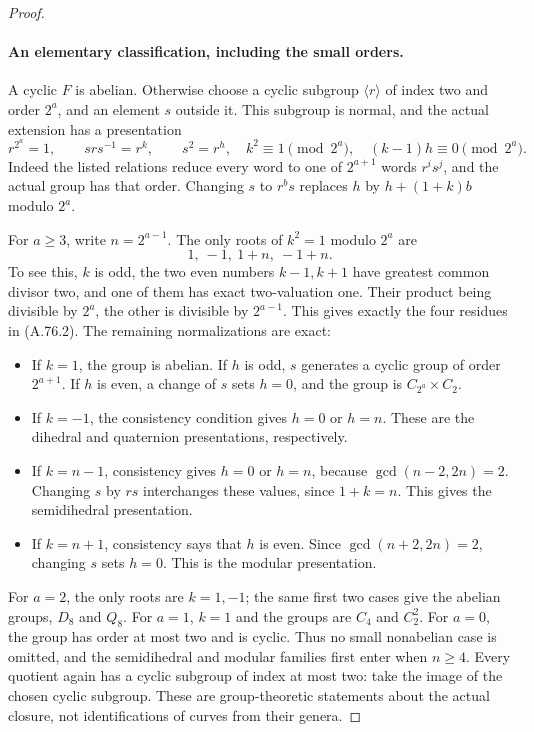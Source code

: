 \begin{proof}
\paragraph{An elementary classification, including the small orders.}
A cyclic \(F\) is abelian. Otherwise choose a cyclic
subgroup \(\langle r\rangle\) of index two and order
\(2^a\), and an element \(s\) outside it. This subgroup
is normal, and the actual extension has a presentation
\[
 r^{2^a}=1,\qquad srs^{-1}=r^k,\qquad s^2=r^h,
 \quad k^2\equiv1\pmod{2^a},\quad (k-1)h\equiv0\pmod{2^a}.
                                                        \tag{A.76.1}
\]
Indeed the listed relations reduce every word to one of
\(2^{a+1}\) words \(r^i s^j\), and the actual group
has that order. Changing \(s\) to \(r^b s\) replaces
\(h\) by \(h+(1+k)b\) modulo \(2^a\).

For \(a\ge3\), write \(n=2^{a-1}\). The only roots
of \(k^2=1\) modulo \(2^a\) are
\[
                         1,\ -1,\ 1+n,\ -1+n.
                                                        \tag{A.76.2}
\]
To see this, \(k\) is odd, the two even numbers \(k-1,k+1\)
have greatest common divisor two, and one of them has
exact two-valuation one. Their product being divisible
by \(2^a\), the other is divisible by \(2^{a-1}\).
This gives exactly the four residues in (A.76.2).
The remaining normalizations are exact:
\begin{itemize}
\item If \(k=1\), the group is abelian. If \(h\) is odd,
\(s\) generates a cyclic group of order \(2^{a+1}\).
If \(h\) is even, a change of \(s\) sets \(h=0\),
and the group is \(C_{2^a}\times C_2\).
\item If \(k=-1\), the consistency condition gives
\(h=0\) or \(h=n\). These are the dihedral and
quaternion presentations, respectively.
\item If \(k=n-1\), consistency gives \(h=0\) or
\(h=n\), because \(\gcd(n-2,2n)=2\). Changing
\(s\) by \(rs\) interchanges these values, since
\(1+k=n\). This gives the semidihedral presentation.
\item If \(k=n+1\), consistency says that \(h\)
is even. Since \(\gcd(n+2,2n)=2\), changing \(s\)
sets \(h=0\). This is the modular presentation.
\end{itemize}

For \(a=2\), the only roots are \(k=1,-1\); the
same first two cases give the abelian groups, \(D_8\)
and \(Q_8\). For \(a=1\), \(k=1\) and the groups
are \(C_4\) and \(C_2^2\). For \(a=0\), the group
has order at most two and is cyclic. Thus no small
nonabelian case is omitted, and the semidihedral and
modular families first enter when \(n\ge4\).
Every quotient again has a cyclic subgroup of index at
most two: take the image of the chosen cyclic subgroup.
These are group-theoretic statements about the actual
closure, not identifications of curves from their genera.


\end{proof}
